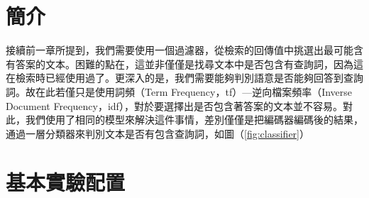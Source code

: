 \section{簡介}
接續前一章所提到，我們需要使用一個過濾器，從檢索的回傳值中挑選出最可能含有答案的文本。困難的點在，這並非僅僅是找尋文本中是否包含有查詢詞，因為這在檢索時已經使用過了。更深入的是，我們需要能夠判別語意是否能夠回答到查詢詞。故在此若僅只是使用詞頻（Term Frequency，tf）—逆向檔案頻率（Inverse Document Frequency，idf），對於要選擇出是否包含著答案的文本並不容易。對此，我們使用了相同的模型來解決這件事情，差別僅僅是把編碼器編碼後的結果，通過一層分類器來判別文本是否有包含查詢詞，如圖（\ref{fig:classifier}）%
\section{基本實驗配置}
